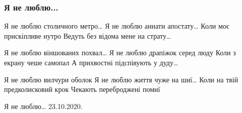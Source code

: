  
 
 

\subsubsection{Я не люблю...}
\label{sec:poetry.rus.mykola_dudar_1950.ja_ne_ljublju}

Я не люблю столичного метро…
Я не люблю аннати апостату…
Коли моє прискіпливе нутро
Ведуть без відома мене на страту…

Я не люблю віншованих похвал…
Я не люблю драпіжок серед люду
Коли з екрану чеше самопал
А прихвостні підспівують у дуду…

Я не люблю вилчури оболок
Я не люблю життя чуже на шиї…
Коли на твій предколисковий крок
Чекають переброджені помиї

Я не люблю…
23.10.2020.
